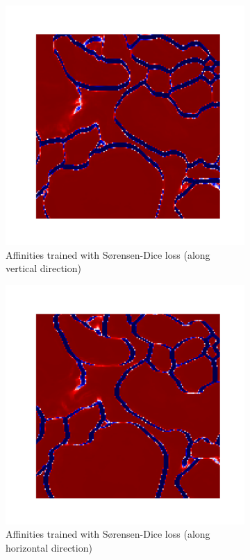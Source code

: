 \begin{figure}[t]
\begin{subfigure}[t]{0.47\linewidth}
\includegraphics[width=0.65\linewidth,trim=1.50in 1.4in 1.4in 1.50in,clip]{./figs/affs_compare/affs1.pdf} %
\caption{\centering Affinities trained with S\o rensen-Dice loss (along vertical direction)}
\end{subfigure}\hfill
\begin{subfigure}[t]{0.47\textwidth}
\centering
\includegraphics[width=0.65\linewidth,trim=1.50in 1.4in 1.4in 1.50in,clip]{./figs/affs_compare/affs2.pdf} %
\caption{\centering Affinities trained with S\o rensen-Dice loss (along horizontal direction)}
\end{subfigure}\vspace{2em}\\
\begin{subfigure}[t]{0.47\linewidth}
\centering

\end{subfigure}
\end{figure}
